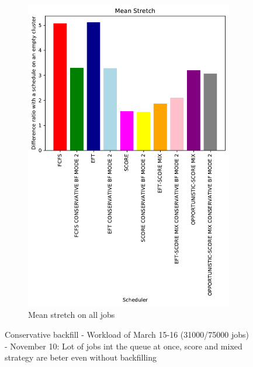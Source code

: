 \documentclass[a4paper]{article}
\begin{document}
\begin{figure}[H]
\begin{subfigure}[b]{0.4\linewidth}\centering\includegraphics[width=0.9\linewidth]{MBSS/plot/Results_FCFS_Score_Backfill_2022-03-15->2022-03-16_V9271_Mean_Stretch_450_128_32_256_4_1024.pdf}\caption{Mean stretch on all jobs}\end{subfigure}
\caption{Conservative backfill - Workload of March 15-16 (31000/75000 jobs) - November 10: Lot of jobs int the queue at once, score and mixed strategy are beter even without backfilling}\end{figure}
\end{document}
